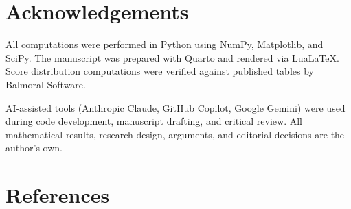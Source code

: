 \documentclass[
  letterpaper,
  DIV=11,
  numbers=noendperiod]{scrartcl}
\begin{document}
\section*{Acknowledgements}\label{acknowledgements}

All computations were performed in Python using NumPy, Matplotlib, and
SciPy. The manuscript was prepared with Quarto and rendered via
LuaLaTeX. Score distribution computations were verified against
published tables by Balmoral Software.

AI-assisted tools (Anthropic Claude, GitHub Copilot, Google Gemini) were
used during code development, manuscript drafting, and critical review.
All mathematical results, research design, arguments, and editorial
decisions are the author's own.

\section*{References}\label{references}
\end{document}
